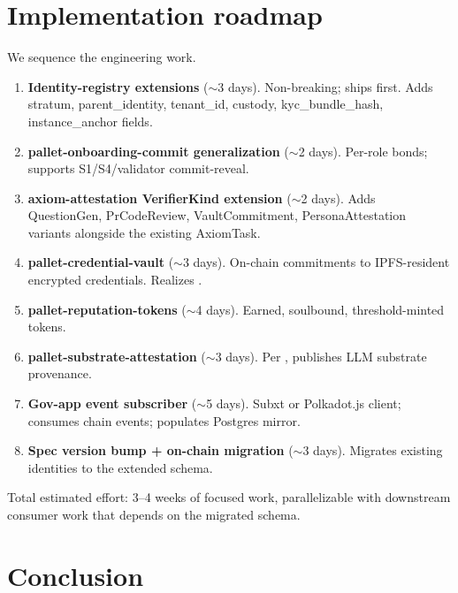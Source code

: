 \documentclass[11pt,a4paper,parskip=half-,DIV=12,headings=standardclasses]{scrartcl}
\theoremstyle{ncthm}
\theoremstyle{ncdef}
\newif\ifpublicrelease
\begin{document}
\ifpublicrelease\else
\section{Implementation roadmap}\label{sec:roadmap}

We sequence the engineering work.

\begin{enumerate}
\item \textbf{Identity-registry extensions} ($\sim$3 days).
  Non-breaking; ships first. Adds stratum, parent\_identity, tenant\_id,
  custody, kyc\_bundle\_hash, instance\_anchor fields.
\item \textbf{pallet-onboarding-commit generalization} ($\sim$2 days).
  Per-role bonds; supports S1/S4/validator commit-reveal.
\item \textbf{axiom-attestation VerifierKind extension} ($\sim$2 days).
  Adds QuestionGen, PrCodeReview, VaultCommitment, PersonaAttestation
  variants alongside the existing AxiomTask.
\item \textbf{pallet-credential-vault} ($\sim$3 days). On-chain
  commitments to IPFS-resident encrypted credentials. Realizes
  .
\item \textbf{pallet-reputation-tokens} ($\sim$4 days). Earned,
  soulbound, threshold-minted tokens.
\item \textbf{pallet-substrate-attestation} ($\sim$3 days). Per
  , publishes LLM substrate provenance.
\item \textbf{Gov-app event subscriber} ($\sim$5 days). Subxt or
  Polkadot.js client; consumes chain events; populates Postgres mirror.
\item \textbf{Spec version bump + on-chain migration} ($\sim$3 days).
  Migrates existing identities to the extended schema.
\end{enumerate}

Total estimated effort: 3--4 weeks of focused work, parallelizable
with downstream consumer work that depends on the migrated schema.
\fi

\section{Conclusion}\label{sec:conclusion}
\end{document}
